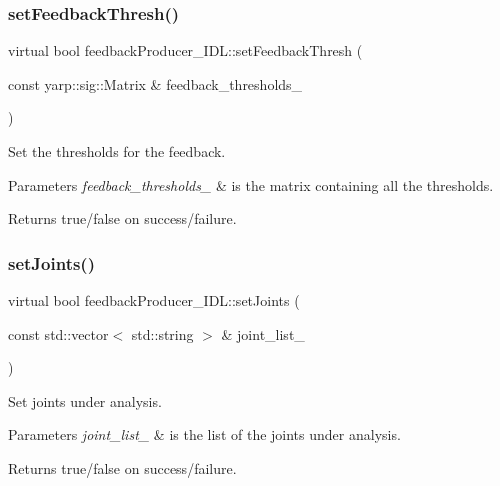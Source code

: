 \subsubsection{\texorpdfstring{setFeedbackThresh()}{setFeedbackThresh()}}
{\footnotesize\ttfamily virtual bool feedback\+Producer\+\_\+\+I\+D\+L\+::set\+Feedback\+Thresh (\begin{DoxyParamCaption}\item[{const yarp\+::sig\+::\+Matrix \&}]{feedback\+\_\+thresholds\+\_\+ }\end{DoxyParamCaption})\hspace{0.3cm}{\ttfamily [virtual]}}



Set the thresholds for the feedback. 


\begin{DoxyParams}{Parameters}
{\em feedback\+\_\+thresholds\+\_\+} & is the matrix containing all the thresholds. \\
\hline
\end{DoxyParams}
\begin{DoxyReturn}{Returns}
true/false on success/failure. 
\end{DoxyReturn}
\mbox{\label{classfeedbackProducer__IDL_a13778ed7bd818fb0093565ff99d936a6}} 
\subsubsection{\texorpdfstring{setJoints()}{setJoints()}}
{\footnotesize\ttfamily virtual bool feedback\+Producer\+\_\+\+I\+D\+L\+::set\+Joints (\begin{DoxyParamCaption}\item[{const std\+::vector$<$ std\+::string $>$ \&}]{joint\+\_\+list\+\_\+ }\end{DoxyParamCaption})\hspace{0.3cm}{\ttfamily [virtual]}}



Set joints under analysis. 


\begin{DoxyParams}{Parameters}
{\em joint\+\_\+list\+\_\+} & is the list of the joints under analysis. \\
\hline
\end{DoxyParams}
\begin{DoxyReturn}{Returns}
true/false on success/failure. 
\end{DoxyReturn}
\mbox{\label{classfeedbackProducer__IDL_a364738f5e3477e52c76d2a22672d840b}} 
